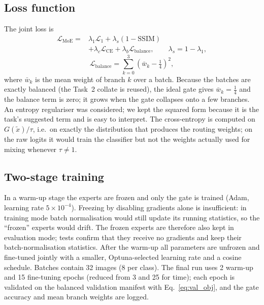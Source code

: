 \documentclass[conference]{IEEEtran}
\begin{document}
\subsection{Loss function}
The joint loss is
\begin{equation}
\begin{split}
\mathcal{L}_{\mathrm{MoE}} = {}& \lambda_1\mathcal{L}_1
 + \lambda_s(1-\mathrm{SSIM})\\
 &+ \lambda_c\mathcal{L}_{\mathrm{CE}}
 + \lambda_b\mathcal{L}_{\mathrm{balance}},\qquad \lambda_s = 1-\lambda_1,
\end{split}
\end{equation}
\begin{equation}
\mathcal{L}_{\mathrm{balance}} = \sum_{k=0}^{3}\left(\bar{w}_k-\tfrac14\right)^2,
\end{equation}
where $\bar{w}_k$ is the mean weight of branch $k$ over a batch. Because the
batches are exactly balanced (the Task~2 collate is reused), the ideal gate
gives $\bar{w}_k=\frac14$ and the balance term is zero; it grows when the gate
collapses onto a few branches. An entropy regulariser was considered; we kept
the squared form because it is the task's suggested term and is easy to
interpret. The cross-entropy is computed on $G(\tilde{x})/\tau$, i.e.\ on
exactly the distribution that produces the routing weights; on the raw
logits it would train the classifier but not the weights actually used for
mixing whenever $\tau\neq1$.

\subsection{Two-stage training}
In a warm-up stage the experts are frozen and only the gate is trained
(Adam, learning rate $5\times10^{-4}$). Freezing by disabling gradients alone
is insufficient: in training mode batch normalisation would still update its
running statistics, so the ``frozen'' experts would drift. The frozen experts
are therefore also kept in evaluation mode; tests confirm that they receive
no gradients and keep their batch-normalisation statistics. After the
warm-up all parameters are unfrozen and fine-tuned jointly with a smaller,
Optuna-selected learning rate and a cosine schedule. Batches contain 32
images (8 per class). The final run uses 2 warm-up and 15 fine-tuning
epochs (reduced from 3 and 25 for time); each epoch is validated on the balanced validation manifest with
Eq.~\eqref{eq:val_obj}, and the gate accuracy and mean branch weights are logged.
\end{document}
